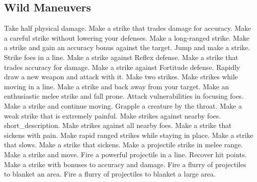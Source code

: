 \subsection{Wild Maneuvers}\label{Wild Maneuvers}
\begin{spelllist}
 Take half physical damage.
 Make a strike that trades damage for accuracy.
 Make a careful strike without lowering your defenses.
 Make a long-ranged strike.
 Make a strike and gain an accuracy bonus against the target.
 Jump and make a strike.
 Strike foes in a line.
 Make a strike against Reflex defense.
 Make a strike that trades accuracy for damage.
 Make a strike against Fortitude defense.
 Rapidly draw a new weapon and attack with it.
 Make two strikes.
 Make strikes while moving in a line.
 Make a strike and back away from your target.
 Make an enthusiastic melee strike and fall prone.
 Attack vulnerabilities in focusing foes.
 Make a strike and continue moving.
 Grapple a creature by the throat.
 Make a weak strike that is extremely painful.
 Make strikes against nearby foes.
 short_description.
 Make strikes against all nearby foes.
 Make a strike that sickens with pain.
 Make rapid ranged strikes while staying in place.
 Make a strike that slows.
 Make a strike that sickens.
 Make a projectile strike in melee range.
 Make a strike and move.
 Fire a powerful projectile in a line.
 Recover hit points.
 Make a strike with bonuses to accuracy and damage.
 Fire a flurry of projectiles to blanket an area.
 Fire a flurry of projectiles to blanket a large area.
\end{spelllist}
